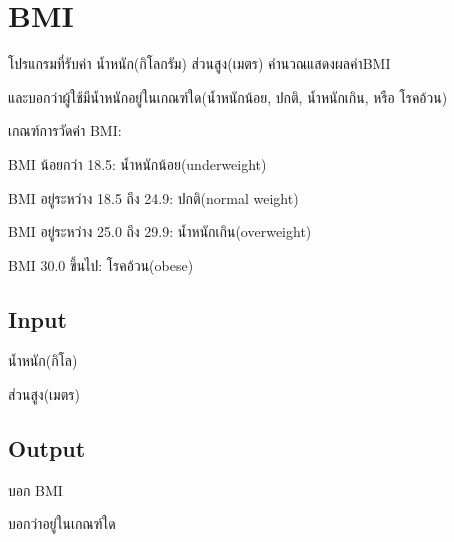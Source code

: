 \documentclass{article}
\begin{document}
\section*{BMI}

โปรแกรมที่รับค่า น้ำหนัก(กิโลกรัม) ส่วนสูง(เมตร) คำนวณแสดงผลค่าBMI

และบอกว่าผู้ใช้มีน้ำหนักอยู่ในเกณฑ์ใด(น้ำหนักน้อย, ปกติ, น้ำหนักเกิน, หรือ โรคอ้วน)



เกณฑ์การวัดค่า BMI:



BMI น้อยกว่า 18.5: น้ำหนักน้อย(underweight)



BMI อยู่ระหว่าง 18.5 ถึง 24.9: ปกติ(normal weight)



BMI อยู่ระหว่าง 25.0 ถึง 29.9: น้ำหนักเกิน(overweight)



BMI 30.0 ขึ้นไป: โรคอ้วน(obese)\\



\subsection*{Input}
น้ำหนัก(กิโล)



ส่วนสูง(เมตร)



\subsection*{Output}
บอก BMI



บอกว่าอยู่ในเกณฑ์ใด
\end{document}
